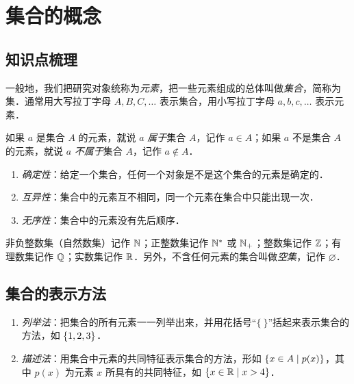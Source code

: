 
\section{集合的概念}

\subsection{知识点梳理}

\begin{definition}[集合与元素]
一般地，我们把研究对象统称为\emph{元素}，把一些元素组成的总体叫做\emph{集合}，简称为集．通常用大写拉丁字母 $A,B,C,\dots$ 表示集合，用小写拉丁字母 $a,b,c,\dots$ 表示元素．

如果 $a$ 是集合 $A$ 的元素，就说 $a$ \emph{属于}集合 $A$，记作 $a\in A$；如果 $a$ 不是集合 $A$ 的元素，就说 $a$ \emph{不属于}集合 $A$，记作 $a\notin A$．
\end{definition}

\begin{definition}[集合中元素的特性]
\begin{enumerate}
  \item \emph{确定性}：给定一个集合，任何一个对象是不是这个集合的元素是确定的．
  \item \emph{互异性}：集合中的元素互不相同，同一个元素在集合中只能出现一次．
  \item \emph{无序性}：集合中的元素没有先后顺序．
\end{enumerate}
\end{definition}

\begin{note}[常用数集及其记法]
非负整数集（自然数集）记作 $\mathbb{N}$；正整数集记作 $\mathbb{N}^{*}$ 或 $\mathbb{N}_{+}$；整数集记作 $\mathbb{Z}$；有理数集记作 $\mathbb{Q}$；实数集记作 $\mathbb{R}$．另外，不含任何元素的集合叫做\emph{空集}，记作 $\varnothing$．
\end{note}

\subsection{集合的表示方法}

\begin{definition}[列举法与描述法]
\begin{enumerate}
  \item \emph{列举法}：把集合的所有元素一一列举出来，并用花括号“$\{\ \}$”括起来表示集合的方法，如 $\left\{ 1,2,3 \right\}$．
  \item \emph{描述法}：用集合中元素的共同特征表示集合的方法，形如 $\left\{ x\in A \mid p(x) \right\}$，其中 $p(x)$ 为元素 $x$ 所具有的共同特征，如 $\left\{ x\in\mathbb{R} \mid x>4 \right\}$．
\end{enumerate}
\end{definition}

